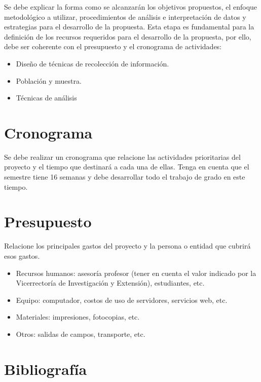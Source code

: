 \documentclass[12pt]{article}
\begin{document}
    Se debe explicar la forma como se alcanzarán los objetivos propuestos, el enfoque metodológico a utilizar, procedimientos de análisis e interpretación de datos y estrategias para el desarrollo de la propuesta.  Esta etapa es fundamental para la definición de los recursos requeridos para el desarrollo de la propuesta, por ello, debe ser coherente con el presupuesto y el cronograma de actividades:
  
    \begin{itemize}
        \item Diseño de técnicas de recolección de información.
        \item Población y muestra.
        \item Técnicas de análisis
    \end{itemize}

    \section{Cronograma}

    Se debe realizar un cronograma que relacione las actividades prioritarias del proyecto y el tiempo que destinará a cada una de ellas.  Tenga en cuenta que el semestre tiene 16 semanas y debe desarrollar todo el trabajo de grado en este tiempo.

    \section{Presupuesto}

    Relacione los principales gastos del proyecto y la persona o entidad que cubrirá esos gastos.

    \begin{itemize}
        
        \item Recursos humanos:  asesoría profesor (tener en cuenta el valor indicado por la Vicerrectoría de Investigación y Extensión), estudiantes, etc.
        \item Equipo:  computador, costos de uso de servidores, servicios web, etc.
        \item Materiales:  impresiones, fotocopias, etc.
        \item Otros:  salidas de campos, transporte, etc.
        
    \end{itemize}

    \section{Bibliografía}

    
\end{document}
